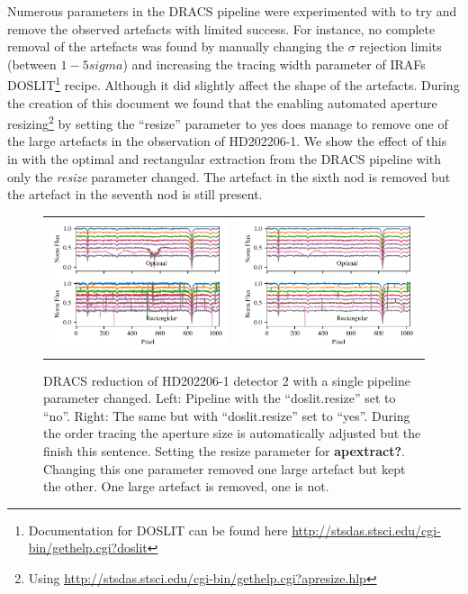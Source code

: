 Numerous parameters in the {DRACS} pipeline were experimented with to try and remove the observed artefacts with limited success. For instance, no complete removal of the artefacts was found by manually changing the \(\sigma\) rejection limits (between \(1-5 sigma\)) and increasing the tracing width parameter of {IRAF}s DOSLIT\footnote{Documentation for DOSLIT can be found here \href{http://stsdas.stsci.edu/cgi-bin/gethelp.cgi?doslit}{http://stsdas.stsci.edu/cgi-bin/gethelp.cgi?doslit}} recipe. Although it did slightly affect the shape of the artefacts.
During the creation of this document we found that the enabling automated aperture resizing\footnote{Using \href{apresize}{http://stsdas.stsci.edu/cgi-bin/gethelp.cgi?apresize.hlp}} by setting the ``resize'' parameter to yes does manage to remove one of the large artefacts in the observation of {HD202206-1}. We show the effect of this in  with the optimal and rectangular extraction from the {DRACS} pipeline with only the \emph{resize} parameter changed. The artefact in the sixth nod is removed but the artefact in the seventh nod is still present.
\begin{figure}
    \centering
    \begin{tabular}{cc}
    \includegraphics[width=0.5\linewidth]{figures/reduction/bp_plots/non_resized_nods_HD202206-1_chip_2} & \includegraphics[width=0.5\linewidth]{figures/reduction/bp_plots/resized_nods_HD202206-1_chip_2}\\
    \end{tabular}
    \caption{{DRACS} reduction of HD202206-1 detector 2 with a single pipeline parameter changed. Left: Pipeline with the ``doslit.resize'' set to ``no''. Right: The same but with ``doslit.resize'' set to ``yes''. During the order tracing the aperture size is automatically adjusted but the {\red{} finish this sentence}. Setting the resize parameter for \textbf{apextract?}. Changing this one parameter removed one large artefact but kept the other. One large artefact is removed, one is not.}
    \label{fig:resizednods}
\end{figure}

